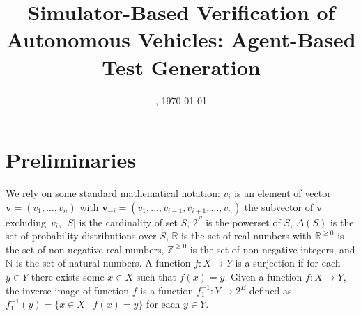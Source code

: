 \documentclass[10pt]{article}
\title{Simulator-Based Verification of Autonomous Vehicles: Agent-Based Test Generation}
\author{}
\date{\DTMcurrenttime, \today}
\theoremstyle{plain}
\newcommand{\vect}[1]{\bm{#1}}
\begin{document}
\maketitle

\section{Preliminaries}
We rely on some standard mathematical notation:
$v_{i}$ is an element of vector $\vect{v} = (v_{1}, \dots, v_{n})$ with $\vect{v}_{-i} = (v_{1}, \dots, v_{i-1}, v_{i+1}, \dots, v_ {n})$ the subvector of $\vect{v}$ excluding~$v_{i}$,
$|S|$ is the cardinality of set $S$,
$2^{S}$ is the powerset of $S$,
$\Delta(S)$ is the set of probability distributions over $S$,
$\mathbb{R}$ is the set of real numbers with $\mathbb{R}^{\ge 0}$ is the set of non-negative real numbers,
$\mathbb{Z}^{\ge 0}$ is the set of non-negative integers, and
$\mathbb{N}$ is the set of natural numbers.
A function $f : X \to Y$ is a surjection if for each $y \in Y$ there exists some $x \in X$ such that $f(x) = y$.
Given a function $f : X \to Y$, the inverse image of function $f$ is a function $f_{1}^{-1} : Y \to 2^{E}$ defined as $f_{1}^{-1}(y) = \{ x \in X \mid f(x) = y \}$ for each $y \in Y$.
\end{document}
